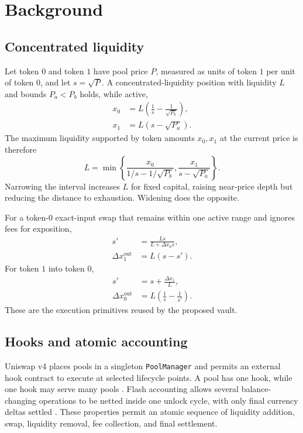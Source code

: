 \documentclass[11pt]{article}
\begin{document}
\section{Background}

\subsection{Concentrated liquidity}

Let token $0$ and token $1$ have pool price $P$, measured as units of token $1$
per unit of token $0$, and let $s=\sqrt{P}$. A concentrated-liquidity position
with liquidity $L$ and bounds $P_a<P_b$ holds, while active,
\begin{align}
  x_0 &= L\left(\frac{1}{s}-\frac{1}{\sqrt{P_b}}\right), \\
  x_1 &= L\left(s-\sqrt{P_a}\right).
  \label{eq:amounts}
\end{align}
The maximum liquidity supported by token amounts $x_0,x_1$ at the current price
is therefore
\begin{equation}
L=\min\left\{
\frac{x_0}{1/s-1/\sqrt{P_b}},
\frac{x_1}{s-\sqrt{P_a}}
\right\}.
\label{eq:maxliq}
\end{equation}
Narrowing the interval increases $L$ for fixed capital, raising near-price
depth but reducing the distance to exhaustion. Widening does the opposite.

For a token-$0$ exact-input swap that remains within one active range and
ignores fees for exposition,
\begin{align}
  s' &= \frac{Ls}{L+\Delta x_0 s}, \\
  \Delta x_1^{\mathrm{out}} &= L(s-s').
  \label{eq:swap0}
\end{align}
For token $1$ into token $0$,
\begin{align}
  s' &= s+\frac{\Delta x_1}{L}, \\
  \Delta x_0^{\mathrm{out}} &= L\left(\frac{1}{s}-\frac{1}{s'}\right).
  \label{eq:swap1}
\end{align}
These are the execution primitives reused by the proposed vault.

\subsection{Hooks and atomic accounting}

Uniswap v4 places pools in a singleton \texttt{PoolManager} and permits an
external hook contract to execute at selected lifecycle points. A pool has one
hook, while one hook may serve many pools \cite{univ4hooks}. Flash accounting
allows several balance-changing operations to be netted inside one unlock
cycle, with only final currency deltas settled \cite{univ4whitepaper}. These
properties permit an atomic sequence of liquidity addition, swap, liquidity
removal, fee collection, and final settlement.
\end{document}
